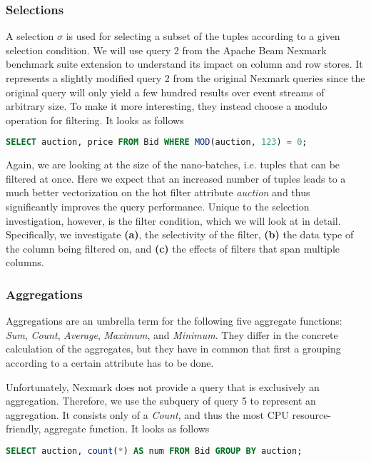 \subsubsection{Selections}

A selection $\sigma$ is used for selecting a subset of the tuples according to a given selection condition.
We will use query 2 from the Apache Beam Nexmark benchmark suite extension to understand its impact on column and row stores. 
It represents a slightly modified query 2 from the original Nexmark queries since the original query will only yield a few hundred results over event streams of arbitrary size.
To make it more interesting, they instead choose a modulo operation for filtering.
It looks as follows

\begin{lstlisting}[language=SQL]
SELECT auction, price FROM Bid WHERE MOD(auction, 123) = 0;
\end{lstlisting}

Again, we are looking at the size of the nano-batches, i.e. tuples that can be filtered at once.
Here we expect that an increased number of tuples leads to a much better vectorization on the hot filter attribute \emph{auction} and thus significantly improves the query performance.
Unique to the selection investigation, however, is the filter condition, which we will look at in detail.
Specifically, we investigate \textbf{(a)}, the selectivity of the filter, \textbf{(b)} the data type of the column being filtered on, and \textbf{(c)} the effects of filters that span multiple columns.

\subsubsection{Aggregations}
Aggregations are an umbrella term for the following five aggregate functions: \emph{Sum}, \emph{Count}, \emph{Average}, \emph{Maximum}, and \emph{Minimum}.
They differ in the concrete calculation of the aggregates, but they have in common that first a grouping according to a certain attribute has to be done.

Unfortunately, Nexmark does not provide a query that is exclusively an aggregation.
Therefore, we use the subquery of query 5 to represent an aggregation.
It consists only of a \emph{Count}, and thus the most CPU resource-friendly, aggregate function.
It looks as follows

\begin{lstlisting}[language=SQL]
SELECT auction, count(*) AS num FROM Bid GROUP BY auction;
\end{lstlisting}

